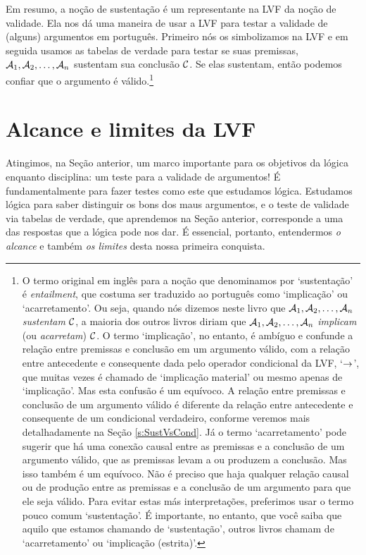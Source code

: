 Em resumo, a noção de sustentação é um representante na LVF da noção de validade.
Ela nos dá uma maneira de usar a LVF para testar a validade de (alguns) argumentos em português.
Primeiro nós os simbolizamos na LVF e em seguida usamos as tabelas de verdade para testar se suas premissas, $\mathcal{A}_1, \mathcal{A}_2, \ldots, \mathcal{A}_n$ sustentam sua conclusão $\mathcal{C}$.
Se elas sustentam, então podemos confiar que o argumento é válido.\footnote{
	O termo original em inglês para a noção que denominamos por `sustentação' é \emph{entailment}, que costuma ser traduzido ao português como `implicação' ou `acarretamento'.
	Ou seja, quando nós dizemos neste livro que $\mathcal{A}_1, \mathcal{A}_2, \ldots, \mathcal{A}_n$ \emph{sustentam} $\mathcal{C}$, a maioria dos outros livros diriam que $\mathcal{A}_1, \mathcal{A}_2, \ldots, \mathcal{A}_n$ \emph{implicam} (ou \emph{acarretam}) $\mathcal{C}$.
	O termo `implicação', no entanto, é ambíguo e confunde a relação entre premissas e conclusão em um argumento válido, com a relação entre antecedente e consequente dada pelo operador condicional da LVF, `$\rightarrow$', que muitas vezes é chamado de `implicação material' ou mesmo apenas de `implicação'.
	Mas esta confusão é um equívoco.
	A relação entre premissas e conclusão de um argumento válido é diferente da relação entre antecedente e consequente de um condicional verdadeiro, conforme veremos mais detalhadamente na Seção \ref{s:SustVsCond}.
	Já o termo `acarretamento' pode sugerir que há uma conexão causal entre as premissas e a conclusão de um argumento válido, que as premissas levam a ou produzem a conclusão.
	Mas isso também é um equívoco.
	Não é preciso que haja qualquer relação causal ou de produção entre as premissas e a conclusão de um argumento para que ele seja válido.
	Para evitar estas más interpretações, preferimos usar o termo pouco comum `sustentação'.
	É importante, no entanto, que você saiba que aquilo que estamos chamando de `sustentação', outros livros chamam de `acarretamento' ou `implicação (estrita)'.}


\section{Alcance e limites da LVF}\label{s:ParadoxesOfMaterialConditional}
Atingimos, na Seção anterior, um marco importante para os objetivos da lógica enquanto disciplina: um teste para a validade de argumentos!
É fundamentalmente para fazer testes como este que estudamos lógica.
Estudamos lógica para saber distinguir os bons dos maus argumentos, e o teste de validade via tabelas de verdade, que aprendemos na Seção anterior, corresponde a uma das respostas que a lógica pode nos dar.
É essencial, portanto, entendermos \emph{o alcance} e também \emph{os limites} desta nossa primeira conquista.

